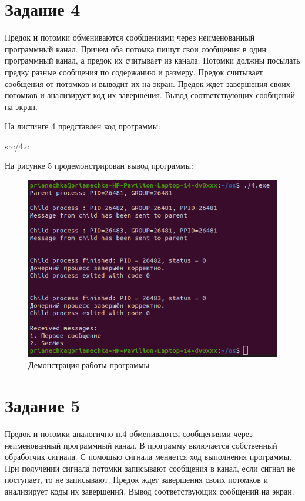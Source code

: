 \chapter*{Задание 4}
Предок и потомки обмениваются сообщениями через неименованный программный канал. 
Причем оба потомка пишут свои сообщения в один программный канал, а предок их считывает из канала. 
Потомки должны посылать предку разные сообщения по содержанию и размеру. 
Предок считывает сообщения от потомков и выводит их на экран. 
Предок ждет завершения своих потомков и анализирует код их завершения. 
Вывод соответствующих сообщений на экран.

На листинге 4 представлен код программы:
\FloatBarrier
\begin{lstinputlisting}[language=C++, caption=Код задания 4, 
	linerange={1-76}, basicstyle=\footnotesize\ttfamily, showstringspaces=false, frame=single,breaklines=true]{src/4.c}
\end{lstinputlisting}
\FloatBarrier

На рисунке 5 продемонстрирован вывод программы:
\FloatBarrier
\begin{figure}[h]
	\begin{center}
		\includegraphics[]{inc/forth.png}
	\end{center}
	\caption{Демонстрация работы программы}
\end{figure}
\FloatBarrier

\chapter*{Задание 5}
Предок и потомки аналогично п.4 обмениваются сообщениями через неименованный программный канал. 
В программу включается собственный обработчик сигнала. 
С помощью сигнала меняется ход выполнения программы. 
При получении сигнала потомки записывают сообщения в канал, если сигнал не поступает, то не записывают. 
Предок ждет завершения своих потомков и анализирует коды их завершений. 
Вывод соответствующих сообщений на экран.

